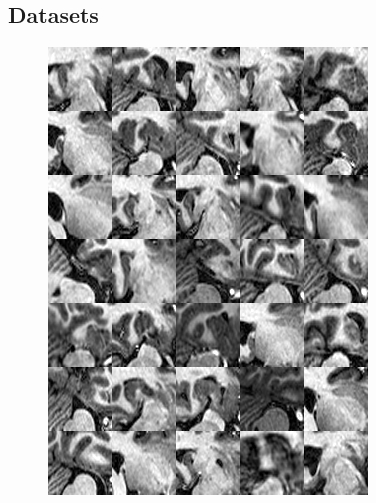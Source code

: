 \subsection*{Datasets}
\begin{figure}[h]
    \centering
        \begin{minipage}{0.49\textwidth}
        \centering
        \includegraphics[width=\linewidth]{Graphics/datasets/dataset_hippo_examples_small.png}
    \end{minipage} \hfill
    \begin{minipage}{0.49\textwidth}
        \centering

\end{minipage}
\end{figure}
